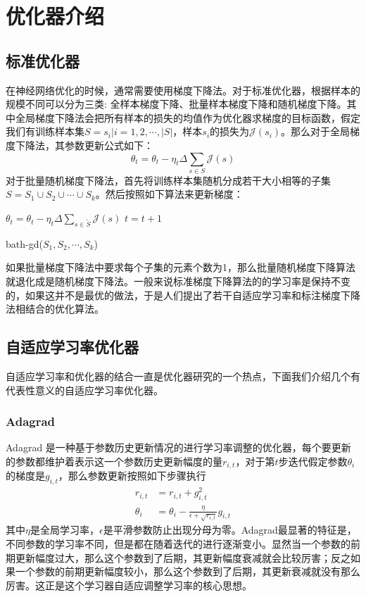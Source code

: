 \documentclass[twoside,a4paper,12pt]{book}%
\begin{document}
\section{优化器介绍}
\subsection{标准优化器}
在神经网络优化的时候，通常需要使用梯度下降法。对于标准优化器，根据样本的规模不同可以分为三类:
全样本梯度下降、批量样本梯度下降和随机梯度下降。其中全局梯度下降法会把所有样本的损失的均值作为优化器求梯度的目标函数，假定我们有训练样本集$S={s_i|i=1,2,\cdots,|S|}$，样本$s_i$的损失为$\mathcal{J}(s_i)$。那么对于全局梯度下降法，其参数更新公式如下：
$$
\theta_t = \theta_t - \eta_t \Delta \sum_{s\in S}\mathcal{J}(s)
$$
对于批量随机梯度下降法，首先将训练样本集随机分成若干大小相等的子集$S=S_1\cup S_2 \cup \cdots \cup S_k$。然后按照如下算法来更新梯度：
\begin{algorithm}[h]
    \begin{algorithmic}[1]
    \label{algline:end} 
       \STATE $\theta_t = \theta_t - \eta_t \Delta \sum_{s\in \widetilde{S}}\mathcal{J}(s)$
       \STATE $t = t + 1$
    \ENDFOR 
    \end{algorithmic}
    \caption{bath-gd($S_1,S_2,\cdots,S_k$)}
    \label{alg:alg1}
\end{algorithm}

如果批量梯度下降法中要求每个子集的元素个数为1，那么批量随机梯度下降算法就退化成是随机梯度下降法。一般来说标准梯度下降算法的的学习率是保持不变的，如果这并不是最优的做法，于是人们提出了若干自适应学习率和标注梯度下降法相结合的优化算法。
\subsection{自适应学习率优化器}
自适应学习率和优化器的结合一直是优化器研究的一个热点，下面我们介绍几个有代表性意义的自适应学习率优化器。
\subsubsection{Adagrad}
Adagrad 是一种基于参数历史更新情况的进行学习率调整的优化器，每个要更新的参数都维护着表示这一个参数历史更新幅度的量$r_{i,t}$，对于第$t$步迭代假定参数$\theta_i$的梯度是$g_{i,t}$，那么参数更新按照如下步骤执行
$$
\begin{aligned}
r_{i,t} &= r_{i,t} + g_{i,t}^2 \\
\theta_i &= \theta_i-\frac{\eta}{\epsilon + \sqrt{r_{i,t}}}g_{i,t}
\end{aligned}
$$
其中$\eta$是全局学习率，$\epsilon$是平滑参数防止出现分母为零。Adagrad最显著的特征是，不同参数的学习率不同，但是都在随着迭代的进行逐渐变小。显然当一个参数的前期更新幅度过大，那么这个参数到了后期，其更新幅度衰减就会比较厉害；反之如果一个参数的前期更新幅度较小，那么这个参数到了后期，其更新衰减就没有那么厉害。这正是这个学习器自适应调整学习率的核心思想。
\end{document}

